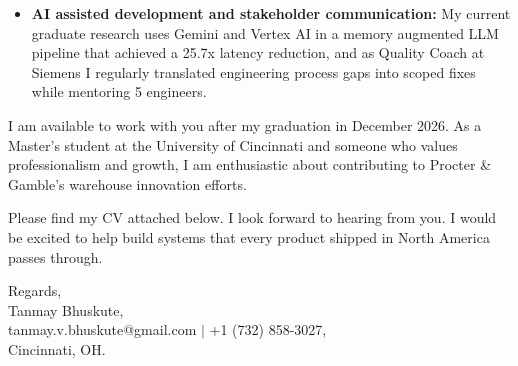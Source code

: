 \documentclass[11pt]{letter}
\begin{document}
\begin{letter}{}
\begin{itemize}[leftmargin=*, itemsep=0.45em]
    \item \textbf{AI assisted development and stakeholder communication:} My current graduate research uses Gemini and Vertex AI in a memory augmented LLM pipeline that achieved a 25.7x latency reduction, and as Quality Coach at Siemens I regularly translated engineering process gaps into scoped fixes while mentoring 5 engineers.
\end{itemize}

I am available to work with you after my graduation in December 2026. As a Master's student at the University of Cincinnati and someone who values professionalism and growth, I am enthusiastic about contributing to Procter \& Gamble's warehouse innovation efforts.

Please find my CV attached below. I look forward to hearing from you. I would be excited to help build systems that every product shipped in North America passes through.

{\setlength{\parskip}{0pt}
Regards,\\
Tanmay Bhuskute,\\
tanmay.v.bhuskute@gmail.com $\mid$ +1 (732) 858-3027,\\
Cincinnati, OH.
}

\end{letter}
\end{document}
